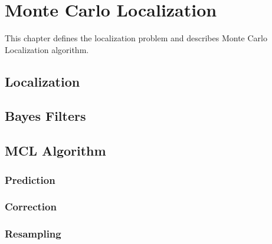 \chapter{Monte Carlo Localization}
\label{chap:mcl}

This chapter defines the localization problem and describes Monte Carlo Localization algorithm.

\section{Localization}

\section{Bayes Filters}

\section{MCL Algorithm}

\subsection{Prediction}
\subsection{Correction}
\subsection{Resampling}
